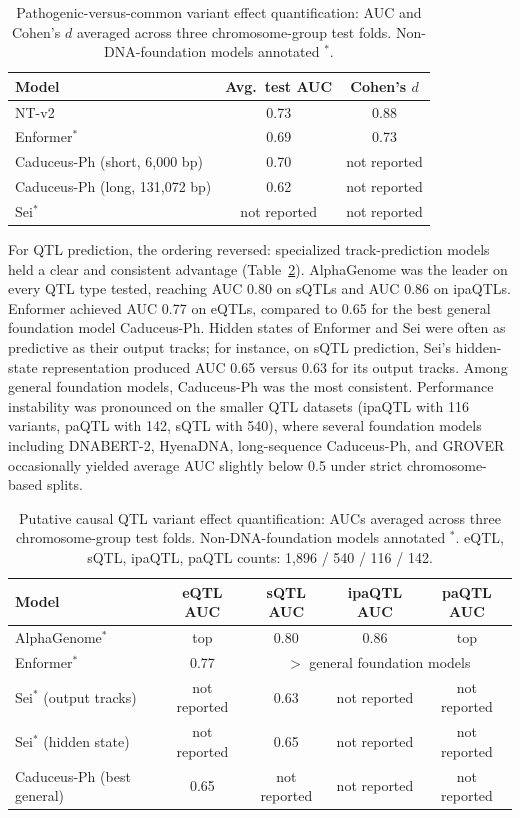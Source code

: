 \documentclass[11pt,a4paper]{article}
\begin{document}
\begin{table}[t]
\centering
\caption{Pathogenic-versus-common variant effect quantification: AUC and Cohen's $d$ averaged across three chromosome-group test folds. Non-DNA-foundation models annotated $^{*}$.}
\label{tab:pathogenic}
\begin{tabular}{lcc}
\toprule
Model & Avg.\ test AUC & Cohen's $d$ \\
\midrule
NT-v2                                   & 0.73 & 0.88 \\
Enformer$^{*}$                          & 0.69 & 0.73 \\
Caduceus-Ph (short, 6{,}000 bp)         & 0.70 & not reported \\
Caduceus-Ph (long, 131{,}072 bp)        & 0.62 & not reported \\
Sei$^{*}$                               & not reported & not reported \\
\bottomrule
\end{tabular}
\end{table}

For QTL prediction, the ordering reversed: specialized track-prediction models held a clear and consistent advantage (Table~\ref{tab:qtl}). AlphaGenome was the leader on every QTL type tested, reaching AUC 0.80 on sQTLs and AUC 0.86 on ipaQTLs. Enformer achieved AUC 0.77 on eQTLs, compared to 0.65 for the best general foundation model Caduceus-Ph. Hidden states of Enformer and Sei were often as predictive as their output tracks; for instance, on sQTL prediction, Sei's hidden-state representation produced AUC 0.65 versus 0.63 for its output tracks. Among general foundation models, Caduceus-Ph was the most consistent. Performance instability was pronounced on the smaller QTL datasets (ipaQTL with 116 variants, paQTL with 142, sQTL with 540), where several foundation models including DNABERT-2, HyenaDNA, long-sequence Caduceus-Ph, and GROVER occasionally yielded average AUC slightly below 0.5 under strict chromosome-based splits.

\begin{table}[t]
\centering
\caption{Putative causal QTL variant effect quantification: AUCs averaged across three chromosome-group test folds. Non-DNA-foundation models annotated $^{*}$. eQTL, sQTL, ipaQTL, paQTL counts: 1{,}896 / 540 / 116 / 142.}
\label{tab:qtl}
\begin{tabular}{lcccc}
\toprule
Model & eQTL AUC & sQTL AUC & ipaQTL AUC & paQTL AUC \\
\midrule
AlphaGenome$^{*}$            & top           & 0.80 & 0.86 & top \\
Enformer$^{*}$               & 0.77          & \multicolumn{3}{c}{$>$ general foundation models} \\
Sei$^{*}$ (output tracks)    & not reported  & 0.63 & not reported & not reported \\
Sei$^{*}$ (hidden state)     & not reported  & 0.65 & not reported & not reported \\
Caduceus-Ph (best general)   & 0.65          & not reported & not reported & not reported \\
\bottomrule
\end{tabular}
\end{table}
\end{document}
